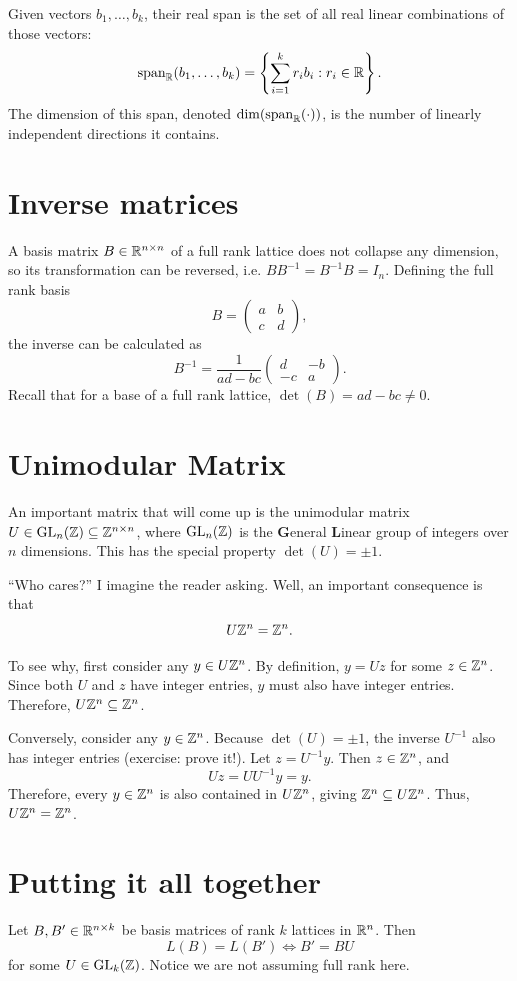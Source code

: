 \documentclass{article}
\begin{document}
Given vectors $b_1,\ldots,b_k$, their real span is the set of all real
linear combinations of those vectors:
\[
\operatorname{span}_{\mathbb{R}}(b_1,\ldots,b_k)
=
\left\{
\sum_{i=1}^{k} r_i b_i
:
r_i\in\mathbb{R}
\right\}.
\]
The dimension of this span, denoted $\dim(\operatorname{span}_{\mathbb{R}}(\cdot))$, is the
number of linearly independent directions it contains.

\section{Inverse matrices}

A basis matrix $B \in \mathbb{R}^{n \times n}$ of a full rank lattice does not collapse any dimension, so its transformation can be reversed, i.e. $BB^{-1} = B^{-1}B = I_n$.
Defining the full rank basis
\[
B=
\begin{pmatrix}
a & b\\
c & d
\end{pmatrix},
\]
the inverse can be calculated as
\[
B^{-1}
=
\frac{1}{ad-bc}
\begin{pmatrix}
d & -b\\
-c & a
\end{pmatrix}.
\]
Recall that for a base of a full rank lattice, $\det(B) = ad - bc \neq 0$.

\section{Unimodular Matrix}

An important matrix that will come up is the unimodular matrix $U \in \operatorname{GL}_n(\mathbb{Z}) \subseteq \mathbb{Z}^{n \times n}$, where $\operatorname{GL}_n(\mathbb{Z})$ is the \textbf{G}eneral \textbf{L}inear group of integers over $n$ dimensions.
This has the special property
$\det(U) = \pm 1$.

``Who cares?'' I imagine the reader asking.
Well, an important consequence is that 
\[
U \mathbb{Z}^n = \mathbb{Z}^n.
\]

To see why, first consider any $y\in U\mathbb{Z}^n$.
By definition, $y=Uz$ for some $z\in\mathbb{Z}^n$.
Since both $U$ and $z$ have integer entries, $y$ must also have integer entries.
Therefore,
$U\mathbb{Z}^n\subseteq\mathbb{Z}^n$.

Conversely, consider any $y\in\mathbb{Z}^n$.
Because $\det(U)=\pm1$, the inverse $U^{-1}$ also has integer entries (exercise: prove it!).
Let $z=U^{-1}y$.
Then $z\in\mathbb{Z}^n$, and
\[
Uz=UU^{-1}y=y.
\]
Therefore, every $y\in\mathbb{Z}^n$ is also contained in $U\mathbb{Z}^n$, giving
$\mathbb{Z}^n\subseteq U\mathbb{Z}^n$.
Thus,
$U\mathbb{Z}^n=\mathbb{Z}^n$.

\section{Putting it all together}
Let $B,B'\in\mathbb{R}^{n\times k}$ be basis matrices of rank $k$ lattices in
$\mathbb{R}^n$. Then
\[
L(B)=L(B')
\iff
B'=BU
\]
for some $U\in\operatorname{GL}_k(\mathbb{Z})$.
Notice we are not assuming full rank here.
\end{document}

